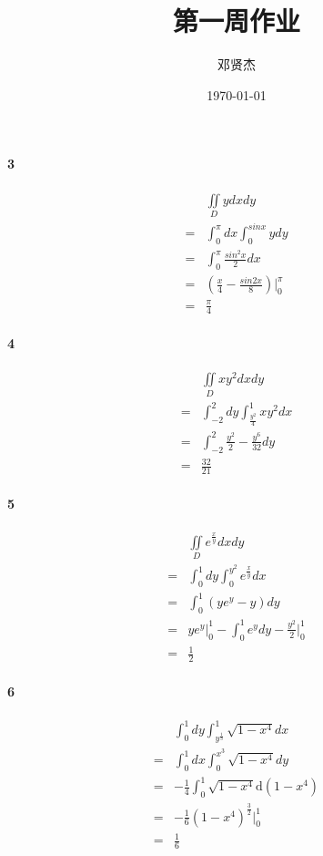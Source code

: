 \documentclass[UTF8]{ctexart}
\title{第一周作业}
\author{邓贤杰}
\date{\today}
\begin{document}
    \maketitle
    \paragraph*{3}
    \begin{align*}
        &\iint \limits_D ydxdy \\
        = &\int_0^{\pi}dx\int_0^{sinx}ydy \\
        = &\int_0^{\pi}\frac{sin^2 x}{2}dx \\
        = &(\frac{x}{4}-\frac{sin2x}{8}) \big|_0^{\pi} \\
        = &\frac{\pi}{4}
    \end{align*}
    \paragraph*{4}
    \begin{align*}
        &\iint \limits_D xy^2dxdy \\
        =&\int_{-2}^{2}dy \int_{\frac{y^2}{4}}^{1} xy^2 dx \\
        =&\int_{-2}^{2} \frac{y^2}{2}-\frac{y^6}{32}dy\\
        =&\frac{32}{21}
    \end{align*}
\paragraph{5}
    \begin{align*}
        &\iint \limits_D e^{\frac{x}{y}}dxdy \\
        =&\int_0^1 dy \int_{0}^{y^2} e^{\frac{x}{y}}dx \\
        =&\int_{0}^{1} (ye^y - y)dy \\
        =& ye^y \big|_0^1 - \int_{0}^{1} e^y dy - \frac{y^2}{2} \big|_0^1\\
        =& \frac{1}{2}  
    \end{align*}
\paragraph*{6}
    \begin{align*}
        &\int_{0}^{1} dy \int_{y^{\frac{1}{3}}}^{1}\sqrt{1-x^4} dx \\
        =& \int_{0}^{1} dx \int_{0}^{x^3} \sqrt{1-x^4} dy \\
        =& -\frac{1}{4} \int_{0}^{1} \sqrt{1-x^4} \mathrm{d}(1-x^4) \\
        =& -\frac{1}{6} (1-x^4)^{\frac{3}{2}} \big|_{0}^{1} \\
        =& \frac{1}{6} 
    \end{align*}
\end{document}
